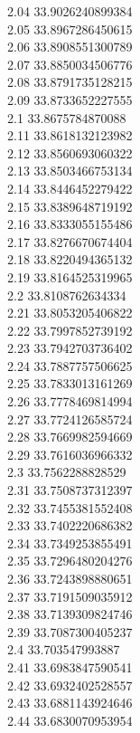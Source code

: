 {2.04	33.9026240899384\\
2.05	33.8967286450615\\
2.06	33.8908551300789\\
2.07	33.8850034506776\\
2.08	33.8791735128215\\
2.09	33.8733652227555\\
2.1	33.8675784870088\\
2.11	33.8618132123982\\
2.12	33.8560693060322\\
2.13	33.8503466753134\\
2.14	33.8446452279422\\
2.15	33.8389648719192\\
2.16	33.8333055155486\\
2.17	33.8276670674404\\
2.18	33.8220494365132\\
2.19	33.8164525319965\\
2.2	33.8108762634334\\
2.21	33.8053205406822\\
2.22	33.7997852739192\\
2.23	33.7942703736402\\
2.24	33.7887757506625\\
2.25	33.7833013161269\\
2.26	33.7778469814994\\
2.27	33.7724126585724\\
2.28	33.7669982594669\\
2.29	33.7616036966332\\
2.3	33.7562288828529\\
2.31	33.7508737312397\\
2.32	33.7455381552408\\
2.33	33.7402220686382\\
2.34	33.7349253855491\\
2.35	33.7296480204276\\
2.36	33.7243898880651\\
2.37	33.7191509035912\\
2.38	33.7139309824746\\
2.39	33.7087300405237\\
2.4	33.703547993887\\
2.41	33.6983847590541\\
2.42	33.6932402528557\\
2.43	33.6881143924646\\
2.44	33.6830070953954\\
}
